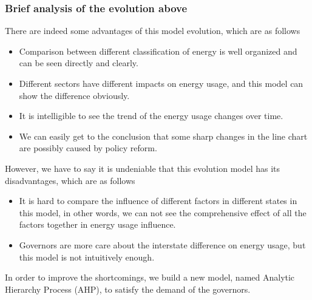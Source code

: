 \documentclass[a4paper,11pt]{article}
\begin{document}
\subsubsection{Brief analysis of the evolution above}
\par There are indeed some advantages of this model evolution, which are as follows
\begin{itemize}
    \item Comparison between different classification of energy is well organized and can be seen directly and clearly.
    \item Different sectors have different impacts on energy usage, and this model can show the difference obviously.
    \item It is intelligible to see the trend of the energy usage changes over time.
    \item We can easily get to the conclusion that some sharp changes in the line chart are possibly caused by policy reform.  
\end{itemize}
\par However, we have to say it is undeniable that this evolution model has its disadvantages, which are as follows
\begin{itemize}
    \item It is hard to compare the influence of different factors in different states in this model, in other words, we can not see the comprehensive effect of all the factors together in energy usage influence.
    \item Governors are more care about the interstate difference on energy usage, but this model is not intuitively enough.

\end{itemize}
\par In order to improve the shortcomings, we build a new model, named Analytic Hierarchy Process (AHP), to satisfy the demand of the governors.
\end{document}
